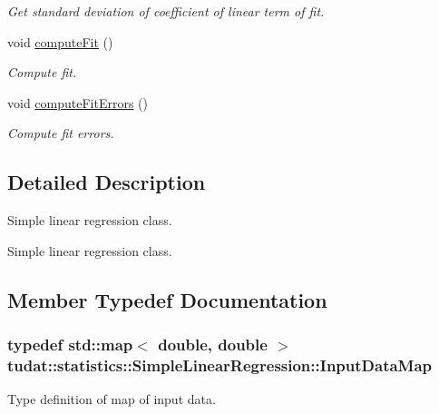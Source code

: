 \begin{DoxyCompactItemize}
\begin{DoxyCompactList}\small\item\em Get standard deviation of coefficient of linear term of fit. \end{DoxyCompactList}\item 
void \hyperlink{classtudat_1_1statistics_1_1SimpleLinearRegression_a88a1ce64434064b374f4f8728b4705bb}{compute\+Fit} ()
\begin{DoxyCompactList}\small\item\em Compute fit. \end{DoxyCompactList}\item 
void \hyperlink{classtudat_1_1statistics_1_1SimpleLinearRegression_a4df085fba924090d46037f8a60b5f8a9}{compute\+Fit\+Errors} ()
\begin{DoxyCompactList}\small\item\em Compute fit errors. \end{DoxyCompactList}\end{DoxyCompactItemize}


\subsection{Detailed Description}
Simple linear regression class. 

Simple linear regression class. 

\subsection{Member Typedef Documentation}
\subsubsection[{\texorpdfstring{Input\+Data\+Map}{InputDataMap}}]{\setlength{\rightskip}{0pt plus 5cm}typedef std\+::map$<$ double, double $>$ {\bf tudat\+::statistics\+::\+Simple\+Linear\+Regression\+::\+Input\+Data\+Map}}\hypertarget{classtudat_1_1statistics_1_1SimpleLinearRegression_aeec88aae0a92c1f4c90c6e736111724c}{}\label{classtudat_1_1statistics_1_1SimpleLinearRegression_aeec88aae0a92c1f4c90c6e736111724c}


Type definition of map of input data. 

